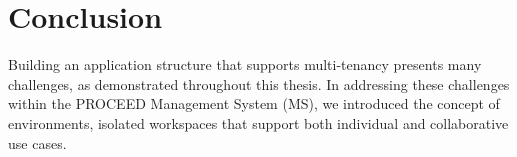 \chapter{Conclusion}
\label{cha:conclusion}

%
%
%
%
%
%
%



Building an application structure that supports multi-tenancy presents many challenges,
as demonstrated throughout this thesis.
In addressing these challenges within the PROCEED Management System (MS),
we introduced the concept of environments, isolated workspaces that
support both individual and collaborative use cases.


